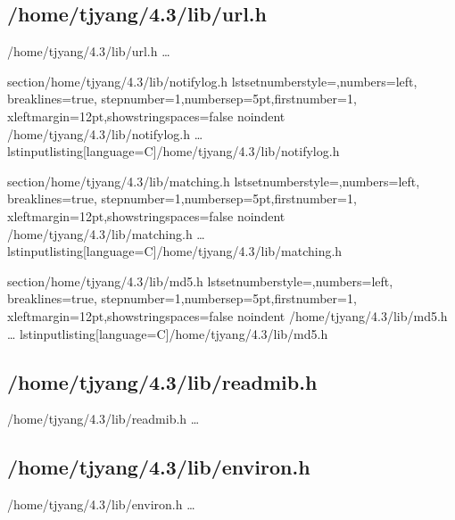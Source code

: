 \subsection{/home/tjyang/4.3/lib/url.h}
\lstset{numberstyle=\tiny,numbers=left,
   breaklines=true,
   stepnumber=1,numbersep=5pt,firstnumber=1,
   xleftmargin=12pt,showstringspaces=false}
\noindent /home/tjyang/4.3/lib/url.h      \ldots



section{/home/tjyang/4.3/lib/notifylog.h}
lstset{numberstyle=\tiny,numbers=left,
  breaklines=true,
  stepnumber=1,numbersep=5pt,firstnumber=1,
  xleftmargin=12pt,showstringspaces=false}
noindent /home/tjyang/4.3/lib/notifylog.h      \ldots
lstinputlisting[language=C]{/home/tjyang/4.3/lib/notifylog.h}


section{/home/tjyang/4.3/lib/matching.h}
lstset{numberstyle=\tiny,numbers=left,
  breaklines=true,
  stepnumber=1,numbersep=5pt,firstnumber=1,
  xleftmargin=12pt,showstringspaces=false}
noindent /home/tjyang/4.3/lib/matching.h      \ldots
lstinputlisting[language=C]{/home/tjyang/4.3/lib/matching.h}


section{/home/tjyang/4.3/lib/md5.h}
lstset{numberstyle=\tiny,numbers=left,
  breaklines=true,
  stepnumber=1,numbersep=5pt,firstnumber=1,
  xleftmargin=12pt,showstringspaces=false}
noindent /home/tjyang/4.3/lib/md5.h      \ldots
lstinputlisting[language=C]{/home/tjyang/4.3/lib/md5.h}


%


\subsection{/home/tjyang/4.3/lib/readmib.h}
\lstset{numberstyle=\tiny,numbers=left,
   breaklines=true,
   stepnumber=1,numbersep=5pt,firstnumber=1,
   xleftmargin=12pt,showstringspaces=false}
\noindent /home/tjyang/4.3/lib/readmib.h      \ldots



\subsection{/home/tjyang/4.3/lib/environ.h}
\lstset{numberstyle=\tiny,numbers=left,
   breaklines=true,
   stepnumber=1,numbersep=5pt,firstnumber=1,
   xleftmargin=12pt,showstringspaces=false}
\noindent /home/tjyang/4.3/lib/environ.h      \ldots



